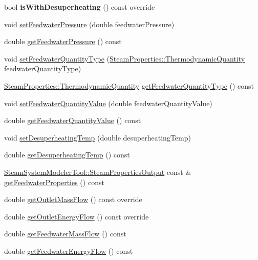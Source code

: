 \begin{DoxyCompactItemize}
\item 
\mbox{\label{class_prv_with_desuperheating_ae7c08df31c2cc21077cbaff390261ac7}} 
bool {\bfseries is\+With\+Desuperheating} () const override
\item 
void \hyperlink{class_prv_with_desuperheating_a8494ebf87e5bd834f621b0c7ca257fbe}{set\+Feedwater\+Pressure} (double feedwater\+Pressure)
\item 
double \hyperlink{class_prv_with_desuperheating_a260bbe19272694af509fb408a821b041}{get\+Feedwater\+Pressure} () const
\item 
void \hyperlink{class_prv_with_desuperheating_a3efaf028d1e6b8349a9e064605cc8d7a}{set\+Feedwater\+Quantity\+Type} (\hyperlink{class_steam_properties_ae0294bedf7d178c2d8fb6aed0f62fbff}{Steam\+Properties\+::\+Thermodynamic\+Quantity} feedwater\+Quantity\+Type)
\item 
\hyperlink{class_steam_properties_ae0294bedf7d178c2d8fb6aed0f62fbff}{Steam\+Properties\+::\+Thermodynamic\+Quantity} \hyperlink{class_prv_with_desuperheating_aa6901e00ecf819d95f79c20ef1775876}{get\+Feedwater\+Quantity\+Type} () const
\item 
void \hyperlink{class_prv_with_desuperheating_afc17940f7d61898eda1bb4a6f1fea8c3}{set\+Feedwater\+Quantity\+Value} (double feedwater\+Quantity\+Value)
\item 
double \hyperlink{class_prv_with_desuperheating_a8645a251b2e77e434a8bc51dfedcad69}{get\+Feedwater\+Quantity\+Value} () const
\item 
void \hyperlink{class_prv_with_desuperheating_ade1b153c495efb451006b3c054ff386e}{set\+Desuperheating\+Temp} (double desuperheating\+Temp)
\item 
double \hyperlink{class_prv_with_desuperheating_af334a9ff9a14d110cb2851a76d5d84fb}{get\+Desuperheating\+Temp} () const
\item 
\hyperlink{struct_steam_system_modeler_tool_1_1_steam_properties_output}{Steam\+System\+Modeler\+Tool\+::\+Steam\+Properties\+Output} const  \& \hyperlink{class_prv_with_desuperheating_a8f4594109bda9bc4030c23cee9841fa8}{get\+Feedwater\+Properties} () const
\item 
double \hyperlink{class_prv_with_desuperheating_a76c03ff2f54c85cd0c80543f23549635}{get\+Outlet\+Mass\+Flow} () const override
\item 
double \hyperlink{class_prv_with_desuperheating_a2394fb62e4fc85252fc4eb15f08e9f1e}{get\+Outlet\+Energy\+Flow} () const override
\item 
double \hyperlink{class_prv_with_desuperheating_a9bd8ee7d5b563110a7279102352b8f4d}{get\+Feedwater\+Mass\+Flow} () const
\item 
double \hyperlink{class_prv_with_desuperheating_a42945a77fcdbaf1e1844c444c696f8b0}{get\+Feedwater\+Energy\+Flow} () const
\end{DoxyCompactItemize}
